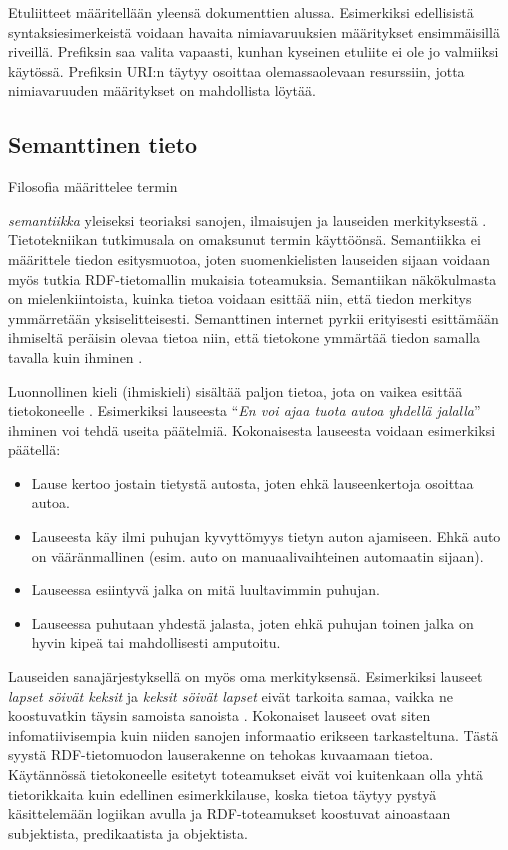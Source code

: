 \documentclass[finnish, 12pt, a4paper, elec, utf8, pdfa, online]{aaltothesis}
\begin{document}
Etuliitteet määritellään yleensä dokumenttien alussa. Esimerkiksi edellisistä syntaksiesimerkeistä voidaan havaita nimiavaruuksien määritykset ensimmäisillä riveillä. Prefiksin saa valita vapaasti, kunhan kyseinen etuliite ei ole jo valmiiksi käytössä. Prefiksin URI:n täytyy osoittaa olemassaolevaan resurssiin, jotta nimiavaruuden määritykset on mahdollista löytää.

\subsection{Semanttinen tieto}

Filosofia määrittelee termin {\textit{semantiikka} yleiseksi teoriaksi sanojen, ilmaisujen ja lauseiden merkityksestä \cite{semantics_phi}. Tietotekniikan tutkimusala on omaksunut termin käyttöönsä. Semantiikka ei määrittele tiedon esitysmuotoa, joten suomenkielisten lauseiden sijaan voidaan myös tutkia RDF-tietomallin mukaisia toteamuksia. Semantiikan näkökulmasta on mielenkiintoista, kuinka tietoa voidaan esittää niin, että tiedon merkitys ymmärretään yksiselitteisesti. Semanttinen internet pyrkii erityisesti esittämään ihmiseltä peräisin olevaa tietoa niin, että tietokone ymmärtää tiedon samalla tavalla kuin ihminen \cite{Berners_visio}.

Luonnollinen kieli (ihmiskieli) sisältää paljon tietoa, jota on vaikea esittää tietokoneelle \cite{semantics}. Esimerkiksi lauseesta ``\textit{En voi ajaa tuota autoa yhdellä jalalla}'' ihminen voi tehdä useita päätelmiä. Kokonaisesta lauseesta voidaan esimerkiksi päätellä:
\begin{itemize}
  \item  Lause kertoo jostain tietystä autosta, joten ehkä lauseenkertoja osoittaa autoa.
  \item  Lauseesta käy ilmi puhujan kyvyttömyys tietyn auton ajamiseen. Ehkä auto on vääränmallinen (esim. auto on manuaalivaihteinen automaatin sijaan).
  \item  Lauseessa esiintyvä jalka on mitä luultavimmin puhujan.
  \item  Lauseessa puhutaan yhdestä jalasta, joten ehkä puhujan toinen jalka on hyvin kipeä tai mahdollisesti amputoitu.
\end{itemize}
Lauseiden sanajärjestyksellä on myös oma merkityksensä. Esimerkiksi lauseet \textit{lapset söivät keksit} ja \textit{keksit söivät lapset} eivät tarkoita samaa, vaikka ne koostuvatkin täysin samoista sanoista \cite{semantics}. Kokonaiset lauseet ovat siten infomatiivisempia kuin niiden sanojen informaatio erikseen tarkasteltuna. Tästä syystä RDF-tietomuodon lauserakenne on tehokas kuvaamaan tietoa. Käytännössä tietokoneelle esitetyt toteamukset eivät voi kuitenkaan olla yhtä tietorikkaita kuin edellinen esimerkkilause, koska tietoa täytyy pystyä käsittelemään logiikan avulla ja RDF-toteamukset koostuvat ainoastaan subjektista, predikaatista ja objektista.

}
\end{document}
